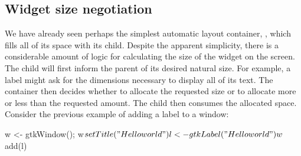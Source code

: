 \subsection{Widget size negotiation}
\label{sec:RGtk2:layout:size}

We have already seen perhaps the simplest automatic layout container,
, which fills all of its space with its
child. Despite the apparent simplicity, there is a considerable amount
of logic for calculating the size of the widget on the screen. The
child will first inform the parent of its desired natural size. For
example, a label might ask for the dimensions necessary to display all
of its text. The container then decides whether to allocate the
requested size or to allocate more or less than the requested
amount. The child then consumes the allocated space. Consider the
previous example of adding a label to a window:
\begin{Schunk}
\begin{Sinput}
 w <- gtkWindow(); w$setTitle("Hello world")
 l <- gtkLabel("Hello world")
 w$add(l)
\end{Sinput}
\end{Schunk}

